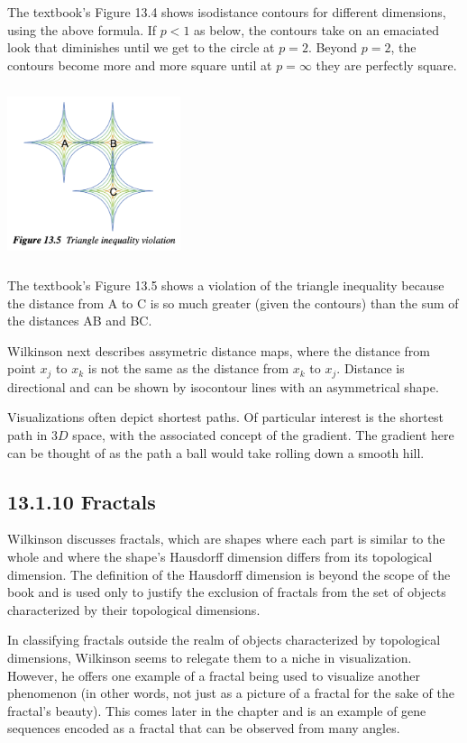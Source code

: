 The textbook's Figure 13.4 shows isodistance contours for different
dimensions, using the above formula. If \(p<1\) as below, the contours
take on an emaciated look that diminishes until we get to the circle at
\(p=2\). Beyond \(p=2\), the contours become more and more square until
at \(p=\infty\) they are perfectly square.

\includegraphics[width=2.00in,height=2in]{fiTriangIneq.png}

The textbook's Figure 13.5 shows a violation of the triangle inequality
because the distance from A to C is so much greater (given the contours)
than the sum of the distances AB and BC.

Wilkinson next describes assymetric distance maps, where the distance
from point \(x_j\) to \(x_k\) is not the same as the distance from
\(x_k\) to \(x_j\). Distance is directional and can be shown by
isocontour lines with an asymmetrical shape.

Visualizations often depict shortest paths. Of particular interest is
the shortest path in \(3D\) space, with the associated concept of the
gradient. The gradient here can be thought of as the path a ball would
take rolling down a smooth hill.

\hypertarget{fractals}{%
\subsection{13.1.10 Fractals}\label{fractals}}

Wilkinson discusses fractals, which are shapes where each part is
similar to the whole and where the shape's Hausdorff dimension differs
from its topological dimension. The definition of the Hausdorff
dimension is beyond the scope of the book and is used only to justify
the exclusion of fractals from the set of objects characterized by their
topological dimensions.

In classifying fractals outside the realm of objects characterized by
topological dimensions, Wilkinson seems to relegate them to a niche in
visualization. However, he offers one example of a fractal being used to
visualize another phenomenon (in other words, not just as a picture of a
fractal for the sake of the fractal's beauty). This comes later in the
chapter and is an example of gene sequences encoded as a fractal that
can be observed from many angles.

